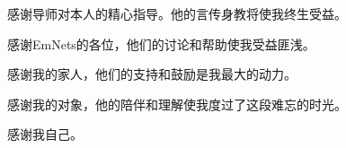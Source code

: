\cleardoublepage
{}

感谢导师对本人的精心指导。他的言传身教将使我终生受益。

感谢EmNets的各位，他们的讨论和帮助使我受益匪浅。

感谢我的家人，他们的支持和鼓励是我最大的动力。

感谢我的对象，他的陪伴和理解使我度过了这段难忘的时光。

感谢我自己。